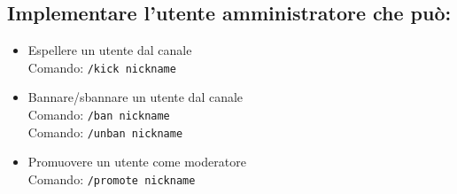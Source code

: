 \subsection*{Implementare l'utente amministratore che può:}
\begin{itemize}
    \item Espellere un utente dal canale \\
    Comando: \texttt{/kick nickname}
    \item Bannare/sbannare un utente dal canale \\
    Comando: \texttt{/ban nickname} \\
    Comando: \texttt{/unban nickname}
    \item Promuovere un utente come moderatore \\
    Comando: \texttt{/promote nickname}
\end{itemize}